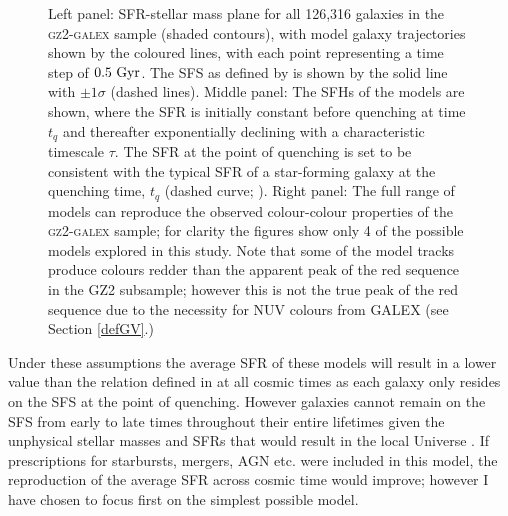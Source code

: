 \begin{figure}
\caption[SFH models in observational planes]{Left panel: SFR-stellar mass plane for all 126,316 galaxies in the \textsc{gz2-galex} sample (shaded contours), with model galaxy trajectories shown by the coloured lines, with each point representing a time step of $0.5~\rm{Gyr}$.  The SFS as defined by \citet{peng10} is shown by the solid line with $\pm1\sigma$ (dashed lines). Middle panel: The SFHs of the models are shown, where the SFR is initially constant before quenching at time $t_q$ and thereafter exponentially declining with a characteristic timescale $\tau$. The SFR at the point of quenching is set to be consistent with the typical SFR of a star-forming galaxy at the quenching time, $t_q$ (dashed curve; \citealt{peng10}). Right panel: The full range of models can reproduce the observed colour-colour properties of the \textsc{gz2-galex} sample; for clarity the figures show only 4 of the possible models explored in this study. Note that some of the model tracks produce colours redder than the apparent peak of the red sequence in the GZ2 subsample; however this is not the true peak of the red sequence due to the necessity for NUV colours from GALEX (see Section \ref{defGV}.)}
\label{sfr_mass_col}
\end{figure}
  
Under these assumptions the average SFR of these models will result in a lower value than the relation defined in \citet{peng10} at all cosmic times as each galaxy only resides on the SFS at the point of quenching. However galaxies cannot remain on the SFS from early to late times throughout their entire lifetimes given the unphysical stellar masses and SFRs that would result in the local Universe \citep{bethermin12, Heinis14}. If prescriptions for starbursts, mergers, AGN etc. were included in this model, the reproduction of the average SFR across cosmic time would improve; however I have chosen to focus first on the simplest possible model.

